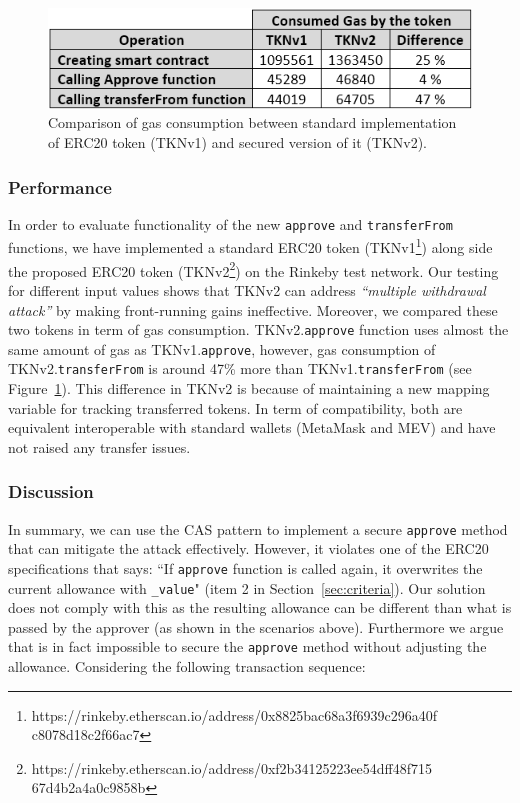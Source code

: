 
\begin{figure}[t]
	\centering
	\includegraphics[width=1.0\linewidth]{figures/multiple_withdrawal_22.png}
	\caption{Comparison of gas consumption between standard implementation of ERC20 token (TKNv1) and secured version of it (TKNv2).\label{fig:gas}}
\end{figure}

\subsubsection*{Performance} In order to evaluate functionality of the new \texttt{approve} and \texttt{transferFrom} functions, we have implemented a standard ERC20 token (TKNv1\footnote{https://rinkeby.etherscan.io/address/0x8825bac68a3f6939c296a40f c8078d18c2f66ac7}) along side the proposed ERC20 token (TKNv2\footnote{https://rinkeby.etherscan.io/address/0xf2b34125223ee54dff48f715 67d4b2a4a0c9858b}) on the Rinkeby test network. Our testing for different input values shows that TKNv2 can address \textit{``multiple withdrawal attack''} by making front-running gains ineffective. Moreover, we compared these two tokens in term of gas consumption. TKNv2.\texttt{approve} function uses almost the same amount of gas as TKNv1.\texttt{approve}, however, gas consumption of TKNv2.\texttt{transferFrom} is around 47\% more than TKNv1.\texttt{transferFrom} (see Figure~\ref{fig:gas}). This difference in TKNv2 is because of maintaining a new mapping variable for tracking transferred tokens. In term of compatibility, both are equivalent interoperable with standard wallets (\eg MetaMask and MEV) and have not raised any transfer issues.

\subsubsection*{Discussion} In summary, we can use the CAS pattern to implement a secure \texttt{approve} method that can mitigate the attack effectively. However, it violates one of the ERC20 specifications that says: ``If \texttt{approve} function is called again, it overwrites the current allowance with \texttt{\_value}" (item 2 in Section~\ref{sec:criteria}). Our solution does not comply with this as the resulting allowance can be different than what is passed by the approver (as shown in the scenarios above). Furthermore we argue that is in fact impossible to secure the \texttt{approve} method without adjusting the allowance. Considering the following transaction sequence:

